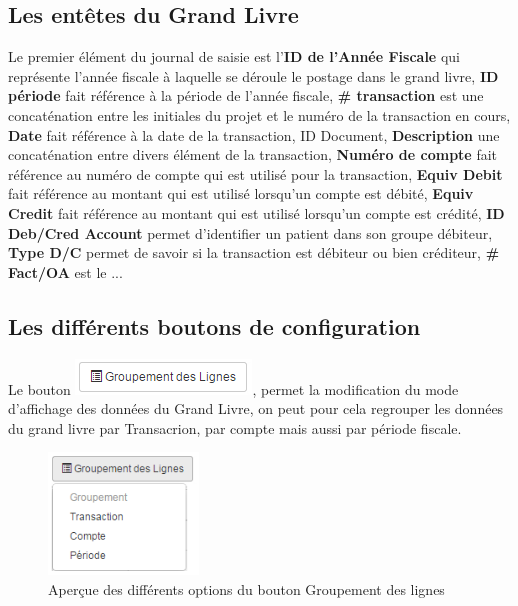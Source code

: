 \documentclass[12pt,a4paper]{report}
\begin{document}
\subsection{Les entêtes du Grand Livre}
Le premier élément du journal de saisie est l'\textbf{ID de l'Année Fiscale} qui représente l'année fiscale à laquelle se déroule le postage dans le grand livre,  \textbf{ID période} fait référence à la période de l'année fiscale, \textbf{\# transaction} est une concaténation entre les initiales du projet et le numéro de la transaction en cours, \textbf{Date} fait référence à la date de la transaction, ID Document, \textbf{Description} une concaténation entre divers élément de la transaction, \textbf{Numéro de compte} fait référence au numéro de compte qui est utilisé pour la transaction, \textbf{Equiv Debit} fait référence au montant qui est utilisé lorsqu'un compte est débité,\textbf{ Equiv Credit} fait référence au montant qui est utilisé lorsqu'un compte est crédité, \textbf{ID Deb/Cred Account} permet d'identifier un patient dans son groupe débiteur, \textbf{Type D/C }permet de savoir si la transaction est débiteur ou bien créditeur, \textbf{\# Fact/OA }est le ...

\subsection{Les différents boutons de configuration}

Le bouton \includegraphics[scale=0.7]{pic/GroupLigne.png}, permet la modification du mode d'affichage des données du Grand Livre,  on peut pour cela regrouper les données du grand livre par Transacrion, par compte mais aussi par période fiscale.

\begin{figure}[h]
\begin{center}
\includegraphics[width=4cm]{pic/MenuRegroupement.png}
\end{center}
\caption{Aperçue des différents options du bouton Groupement des lignes}
\label{Aperçue des différents options du bouton Grouper des lignes}
\end{figure}
\end{document}
